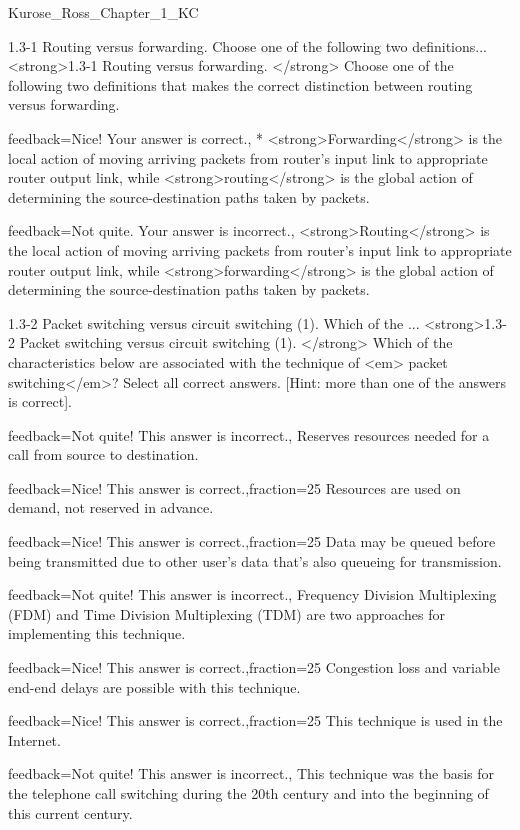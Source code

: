 \documentclass[a4paper]{article}
\begin{document}
\begin{quiz}{Kurose_Ross_Chapter_1_KC}
\begin{multi}[
	points=1,
	penalty=0.33333,
]{1.3-1 Routing versus forwarding.  Choose one of the following two definitions...}
<strong>1.3-1 Routing versus forwarding. </strong> Choose one of the following two definitions that makes the correct distinction between routing versus forwarding.
\item[feedback={Nice! Your answer is correct.},]* <strong>Forwarding</strong> is the local action of moving arriving packets from router’s input link to appropriate router output link, while <strong>routing</strong> is the global action of determining the source-destination paths taken by packets.
\item[feedback={Not quite. Your answer is incorrect.},] <strong>Routing</strong> is the local action of moving arriving packets from router’s input link to appropriate router output link, while <strong>forwarding</strong> is the global action of determining the source-destination paths taken by packets.
\end{multi}

\begin{multi}[
	points=1,
	penalty=0.33333,
	multiple,
]{1.3-2 Packet switching versus circuit switching (1).  Which of the ...}
<strong>1.3-2 Packet switching versus circuit switching (1). </strong> Which of the characteristics below are associated with the technique of <em> packet switching</em>? Select all correct answers. [Hint: more than one of the answers is correct].
\item[feedback={Not quite! This answer is incorrect.},] Reserves resources needed for a call from source to destination.
\item[feedback={Nice! This answer is correct.},fraction=25] Resources are used on demand, not reserved in advance.
\item[feedback={Nice! This answer is correct.},fraction=25] Data may be queued before being transmitted due to other user’s data that’s also queueing for transmission.
\item[feedback={Not quite! This answer is incorrect.},] Frequency Division Multiplexing (FDM) and Time Division Multiplexing (TDM) are two approaches for implementing this technique.
\item[feedback={Nice! This answer is correct.},fraction=25] Congestion loss and variable end-end delays are possible with this technique.
\item[feedback={Nice! This answer is correct.},fraction=25] This technique is used in the Internet.
\item[feedback={Not quite! This answer is incorrect.},] This technique was the basis for the telephone call switching during the 20th century and into the beginning of this current century.
\end{multi}


\end{quiz}
\end{document}

